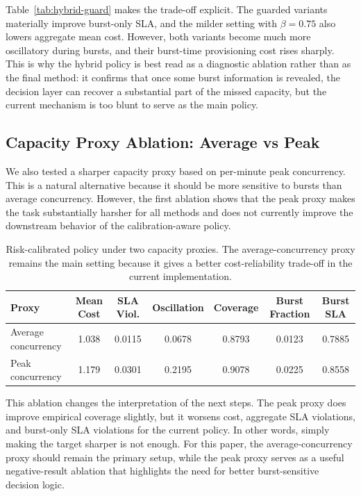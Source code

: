 \documentclass[11pt]{article}
\theoremstyle{plain}
\theoremstyle{definition}
\theoremstyle{remark}
\begin{document}
Table~\ref{tab:hybrid-guard} makes the trade-off explicit. The guarded variants materially improve burst-only SLA, and the milder setting with $\beta=0.75$ also lowers aggregate mean cost. However, both variants become much more oscillatory during bursts, and their burst-time provisioning cost rises sharply. This is why the hybrid policy is best read as a diagnostic ablation rather than as the final method: it confirms that once some burst information is revealed, the decision layer can recover a substantial part of the missed capacity, but the current mechanism is too blunt to serve as the main policy.

\subsection{Capacity Proxy Ablation: Average vs Peak}
We also tested a sharper capacity proxy based on per-minute peak concurrency. This is a natural alternative because it should be more sensitive to bursts than average concurrency. However, the first ablation shows that the peak proxy makes the task substantially harsher for all methods and does not currently improve the downstream behavior of the calibration-aware policy.

\begin{table}[h]
\centering
\caption{Risk-calibrated policy under two capacity proxies. The average-concurrency proxy remains the main setting because it gives a better cost-reliability trade-off in the current implementation.}
\label{tab:proxy-ablation}
\begin{tabular}{lcccccc}
\toprule
Proxy & Mean Cost & SLA Viol. & Oscillation & Coverage & Burst Fraction & Burst SLA \\
\midrule
Average concurrency & 1.038 & 0.0115 & 0.0678 & 0.8793 & 0.0123 & 0.7885 \\
Peak concurrency & 1.179 & 0.0301 & 0.2195 & 0.9078 & 0.0225 & 0.8558 \\
\bottomrule
\end{tabular}
\end{table}

This ablation changes the interpretation of the next steps. The peak proxy does improve empirical coverage slightly, but it worsens cost, aggregate SLA violations, and burst-only SLA violations for the current policy. In other words, simply making the target sharper is not enough. For this paper, the average-concurrency proxy should remain the primary setup, while the peak proxy serves as a useful negative-result ablation that highlights the need for better burst-sensitive decision logic.
\end{document}
